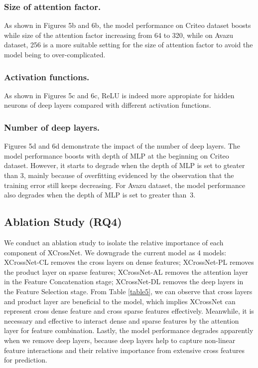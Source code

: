 \documentclass[letterpaper]{article} \usepackage{aaai21}  \usepackage{times}  \usepackage{helvet} \usepackage{courier}  \usepackage[hyphens]{url}  \usepackage{graphicx} \urlstyle{rm} \def\UrlFont{\rm}  \usepackage{natbib}  \usepackage{caption} \frenchspacing  \setlength{\pdfpagewidth}{8.5in}  \setlength{\pdfpageheight}{11in}  \usepackage{graphicx}
\begin{document}
\vspace{-0.13cm}
\subsubsection{Size of attention factor.} As shown in Figures 5b and 6b, the model performance on Criteo dataset boosts while size of the attention factor increasing from 64 to 320, while on Avazu dataset, 256 is a more suitable setting for the size of attention factor to avoid the model being to over-complicated.

\vspace{-0.13cm}
\subsubsection{Activation functions.} As shown in Figures 5c and 6c, ReLU is indeed more appropiate for hidden neurons of deep layers compared with different activation functions.

\vspace{-0.13cm}
\subsubsection{Number of deep layers.} Figures 5d and 6d demonstrate the impact of the number of deep layers. The model performance boosts with depth of MLP at the beginning on Criteo dataset. However, it starts to degrade when the depth of MLP is set to gteater than 3, mainly because of overfitting evidenced by the observation that the training error still keeps decreasing. For Avazu dataset, the model performance also degrades when the depth of MLP is set to greater than~3.


\subsection{Ablation Study (RQ4)}

We conduct an ablation study to isolate the relative importance of each component of XCrossNet. We downgrade the current model as 4 models: XCrossNet-CL removes the cross layers on dense features; XCrossNet-PL removes the product layer on sparse features; XCrossNet-AL removes the attention layer in the Feature Concatenation stage; XCrossNet-DL removes the deep layers in the Feature Selection stage. From Table \ref{table5}, we can observe that cross layers and product layer are beneficial to the model, which implies XCrossNet can represent cross dense feature and cross sparse features effectively. Meanwhile, it is necessary and effective to interact dense and sparse features by the attention layer for feature combination. Lastly, the model performance degrades apparently when we remove deep layers, because deep layers help to capture non-linear feature interactions and their relative importance from extensive cross features for prediction. 
\end{document}
